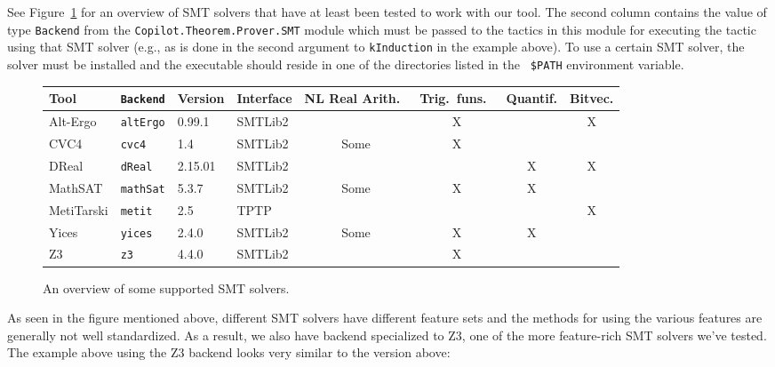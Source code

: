 See Figure~\ref{fig:solvers} for an overview of SMT solvers that have at least
been tested to work with our tool. The second column contains the value of type
{\tt Backend} from the {\tt Copilot.Theorem.Prover.SMT} module which must be
passed to the tactics in this module for executing the tactic using that SMT
solver (e.g., as is done in the second argument to {\tt kInduction} in the
example above). To use a certain SMT solver, the solver must be installed and
the executable should reside in one of the directories listed in the {\tt
\$PATH} environment variable.

\newcommand{\Yes}{\checkmark}
\newcommand{\No}{\textsf{X}}
\newcommand{\Some}{\textsf{Some}}

\begin{figure}
\begin{center}
\begin{tabular}{llllcccc}
Tool       & {\tt Backend} & Version & Interface & NL Real Arith.\ & Trig.\ funs.\ & Quantif. & Bitvec. \\
\toprule
Alt-Ergo   & {\tt altErgo} & 0.99.1  & SMTLib2   & \Yes{}          & \No{}         & \Yes{}      & \No{}      \\
CVC4       & {\tt cvc4}    & 1.4     & SMTLib2   & \Some{}         & \No{}         & \Yes{}      & \Yes{}     \\
DReal      & {\tt dReal}   & 2.15.01 & SMTLib2   & \Yes{}          & \Yes{}        & \No{}       & \No{}      \\
MathSAT    & {\tt mathSat} & 5.3.7   & SMTLib2   & \Some{}         & \No{}         & \No{}       & \Yes{}     \\
MetiTarski & {\tt metit}   & 2.5     & TPTP      & \Yes{}          & \Yes{}        & \Yes{}      & \No{}      \\
Yices      & {\tt yices}   & 2.4.0   & SMTLib2   & \Some{}         & \No{}         & \No{}       & \Yes{}     \\
Z3         & {\tt z3}      & 4.4.0   & SMTLib2   & \Yes{}          & \No{}         & \Yes{}      & \Yes{}     \\
\end{tabular}
\end{center}
\caption{An overview of some supported SMT solvers.}
\label{fig:solvers}
\end{figure}

As seen in the figure mentioned above, different SMT solvers have different
feature sets and the methods for using the various features are generally not
well standardized. As a result, we also have backend specialized to Z3, one of
the more feature-rich SMT solvers we've tested. The example above using the Z3
backend looks very similar to the version above:


